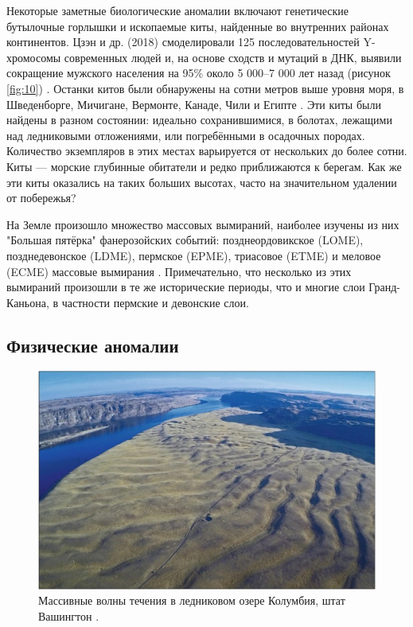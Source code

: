 \documentclass[10pt,twocolumn,letterpaper]{article}
\begin{document}
Некоторые заметные биологические аномалии включают генетические бутылочные горлышки и ископаемые киты, найденные во внутренних районах континентов. Цзэн и др. (2018) смоделировали 125 последовательностей Y-хромосомы современных людей и, на основе сходств и мутаций в ДНК, выявили сокращение мужского населения на 95\% около 5 000–7 000 лет назад (рисунок \ref{fig:10}) \cite{62}. Останки китов были обнаружены на сотни метров выше уровня моря, в Шведенборге, Мичигане, Вермонте, Канаде, Чили и Египте \cite{63,64,65,66}. Эти киты были найдены в разном состоянии: идеально сохранившимися, в болотах, лежащими над ледниковыми отложениями, или погребёнными в осадочных породах. Количество экземпляров в этих местах варьируется от нескольких до более сотни. Киты — морские глубинные обитатели и редко приближаются к берегам. Как же эти киты оказались на таких больших высотах, часто на значительном удалении от побережья?

На Земле произошло множество массовых вымираний, наиболее изучены из них "Большая пятёрка" фанерозойских событий: позднеордовикское (LOME), позднедевонское (LDME), пермское (EPME), триасовое (ETME) и меловое (ECME) массовые вымирания \cite{88,89}. Примечательно, что несколько из этих вымираний произошли в те же исторические периоды, что и многие слои Гранд-Каньона, в частности пермские и девонские слои.

\subsection{Физические аномалии}

\begin{figure}[b]
\begin{center}
   \includegraphics[width=1\linewidth]{columbia.jpg}
\end{center}
   \caption{Массивные волны течения в ледниковом озере Колумбия, штат Вашингтон \cite{80}.}
\label{fig:11}
\label{fig:onecol}
\end{figure}
\end{document}
